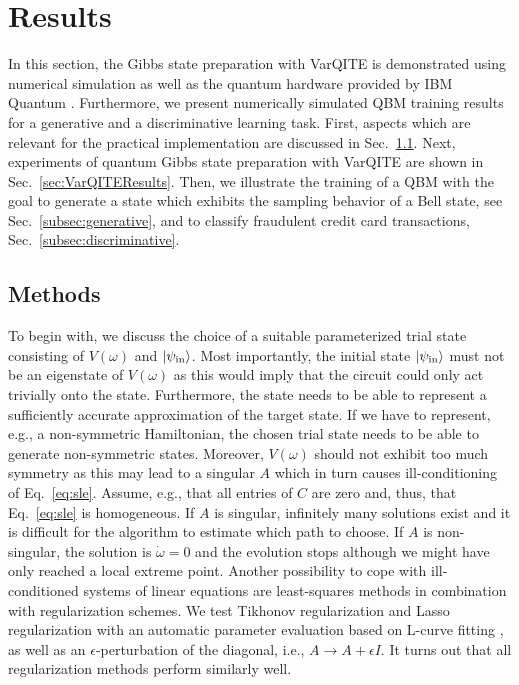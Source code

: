 \documentclass[twocolumn, aps, pra, superscriptaddress, floatfix]{revtex4}
\begin{document}
\section{Results} \label{sec:results}

In this section, the Gibbs state preparation with VarQITE is demonstrated using numerical simulation as well as the quantum hardware provided by IBM Quantum \cite{ibmQX}. 
Furthermore, we present numerically simulated QBM training results for a generative and a discriminative learning task.
First, aspects which are relevant for the practical implementation are discussed in Sec.~\ref{sec:impRel}. 
Next, experiments of quantum Gibbs state preparation with VarQITE are shown in Sec.~\ref{sec:VarQITEResults}.
Then, we illustrate the training of a QBM with the goal to generate a state which exhibits the sampling behavior of a Bell state, see Sec.~\ref{subsec:generative}, and to classify fraudulent credit card transactions, Sec.~\ref{subsec:discriminative}. 

\subsection{Methods}
\label{sec:impRel}

To begin with, we discuss the choice of a suitable parameterized trial state consisting of $V\left(\omega\right)$ and $\ket{\psi_{\text{in}}}$.
Most importantly, the initial state $\ket{\psi_{\text{in}}}$ must not be an eigenstate of $V\left(\omega\right)$ as this would imply that the circuit could only act trivially onto the state.
Furthermore, the state needs to be able to represent a sufficiently accurate approximation of the target state. If we have to represent, e.g., a non-symmetric Hamiltonian, the chosen trial state needs to be able to generate non-symmetric states.
Moreover, $V\left(\omega\right)$ should not exhibit too much symmetry as this may lead to a singular $A$ which in turn causes ill-conditioning of Eq.~\eqref{eq:sle}.
Assume, e.g., that all entries of $C$ are zero and, thus, that Eq.~\eqref{eq:sle} is homogeneous. If $A$ is singular, infinitely many solutions exist and it is difficult for the algorithm to estimate which path to choose. If $A$ is non-singular, the solution is  $\dot{\omega} = 0$ and the evolution stops although we might have only reached a local extreme point. 
Another possibility to cope with ill-conditioned systems of linear equations are least-squares methods in combination with regularization schemes. We test Tikhonov regularization \cite{Tikhonov:1620560} and Lasso regularization \cite{lassoTibshirani11} with an automatic parameter evaluation based on L-curve fitting \cite{Hansen00thel-curve}, as well as an $\epsilon$-perturbation of the diagonal, i.e., $A\rightarrow A+\epsilon I$. It turns out that all regularization methods perform similarly well. 
\end{document}
